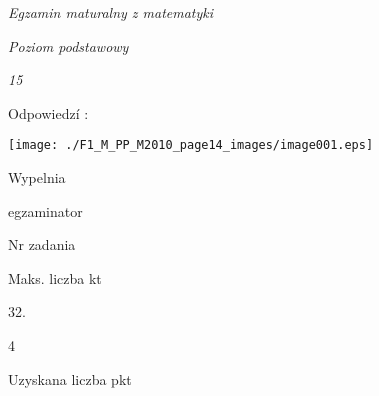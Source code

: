\documentclass[a4paper,12pt]{article}
\begin{document}
{\it Egzamin maturalny z matematyki}

{\it Poziom podstawowy}

{\it 15}

Odpowiedzí :
\begin{center}
\texttt{[image: ./F1\_M\_PP\_M2010\_page14\_images/image001.eps]}
\end{center}
Wypelnia

egzaminator

Nr zadania

Maks. liczba kt

32.

4

Uzyskana liczba pkt
\end{document}
